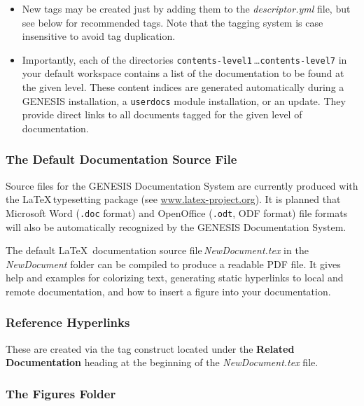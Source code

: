 \documentclass[12pt]{article}
\begin{document}
\begin{itemize}
\begin{itemize}

   \item New tags may be created just by adding them to the {\it descriptor.yml} file, but see below for recommended tags.  Note that the tagging system is case insensitive to avoid tag duplication.

   \item Importantly, each of the directories {\tt contents-level1}\,\ldots {\tt contents-level7} in your default workspace contains a list of the documentation to be found at the given level. These content indices are generated automatically during a GENESIS installation, a {\tt userdocs} module installation, or an update. They provide direct links to all documents tagged for the given level of documentation.
   
\end{itemize}

\end{itemize}

\subsubsection*{The Default Documentation Source File}

Source files for the GENESIS Documentation System are currently produced with the \LaTeX\,typesetting package (see \href{http://www.latex-project.org/}{www.latex-project.org}). It is planned that Microsoft Word ({\tt .doc} format) and OpenOffice ({\tt .odt}, ODF format) file formats will also be automatically recognized by the GENESIS Documentation System.

The default \LaTeX\, documentation source file\,{\it NewDocument.tex} in the {\it NewDocument} folder can be compiled to produce a readable PDF file. It gives help and examples for colorizing text, generating static hyperlinks to local and remote documentation, and how to insert a figure into your documentation.

\subsubsection*{Reference Hyperlinks}

These are created via the tag construct located under the {\bf Related Documentation} heading at the beginning of the {\it NewDocument.tex} file. 

\subsubsection*{The Figures Folder}
\end{document}
